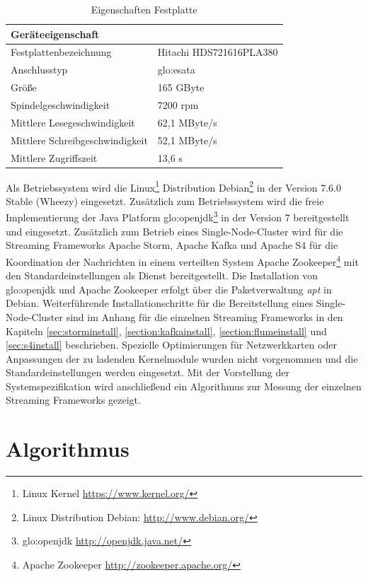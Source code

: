 \begin{table}[ht]
	\centering
		\begin{tabular}{@{}ll@{}} \toprule
			\textbf{Geräteeigenschaft} &  \\ \midrule
			Festplattenbezeichnung & Hitachi HDS721616PLA380 \\
			Anschlusstyp & \gls{glo:esata} \\
			Größe & 165 GByte \\
			Spindelgeschwindigkeit & 7200 rpm \\
			Mittlere Lesegeschwindigkeit & 62,1 MByte/s \\
			Mittlere Schreibgeschwindigkeit & 52,1 MByte/s \\
			Mittlere Zugriffszeit & 13,6 s \\
			\bottomrule			
		\end{tabular}
	\caption{Eigenschaften Festplatte}
	\label{tab:festplatte}
\end{table}

Als Betriebssystem wird die Linux\footnote{Linux Kernel \url{https://www.kernel.org/}} Distribution Debian\footnote{Linux Distribution Debian: \url{http://www.debian.org/}} in der Version 7.6.0 Stable (Wheezy) eingesetzt. Zusätzlich zum Betriebssystem wird die freie Implementierung der Java Platform \gls{glo:openjdk}\footnote{\gls{glo:openjdk} \url{http://openjdk.java.net/}} in der Version 7 bereitgestellt und eingesetzt. Zusätzlich zum Betrieb eines Single-Node-Cluster wird für die Streaming Frameworks Apache Storm, Apache Kafka und Apache S4 für die Koordination der Nachrichten in einem verteilten System Apache Zookeeper\footnote{Apache Zookeeper \url{http://zookeeper.apache.org/}} mit den Standardeinstellungen als Dienst bereitgestellt. Die Installation von \gls{glo:openjdk} und Apache Zookeeper erfolgt über die Paketverwaltung \textit{apt} in Debian. Weiterführende Installationschritte für die Bereitstellung eines Single-Node-Cluster sind im Anhang für die einzelnen Streaming Frameworks in den Kapiteln \ref{sec:storminstall}, \ref{section:kafkainstall}, \ref{section:flumeinstall} und \ref{sec:s4install} beschrieben. Spezielle Optimierungen für Netzwerkkarten oder Anpassungen der zu ladenden Kernelmodule wurden nicht vorgenommen und die Standardeinstellungen werden eingesetzt. Mit der Vorstellung der Systemspezifikation wird anschließend ein Algorithmus zur Messung der einzelnen Streaming Frameworks gezeigt.


\section{Algorithmus}
\label{sec:algorithmus}


